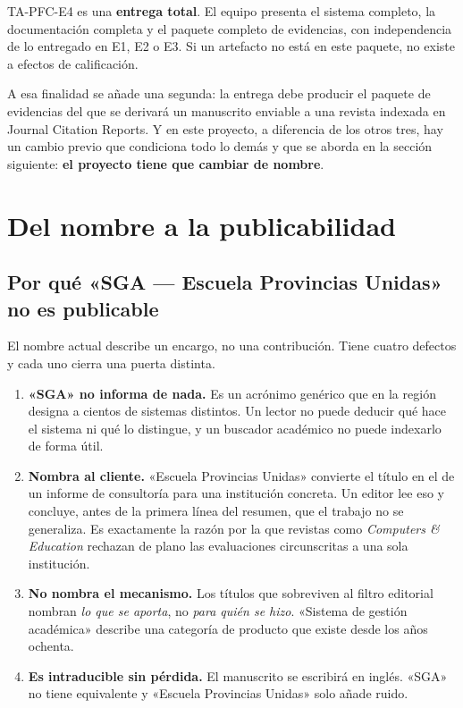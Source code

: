 \documentclass[11pt,a4paper]{article}
\begin{document}
TA-PFC-E4 es una \textbf{entrega total}. El equipo presenta el sistema completo, la documentación completa y el paquete completo de evidencias, con independencia de lo entregado en E1, E2 o E3. Si un artefacto no está en este paquete, no existe a efectos de calificación.

A esa finalidad se añade una segunda: la entrega debe producir el paquete de evidencias del que se derivará un manuscrito enviable a una revista indexada en Journal Citation Reports. Y en este proyecto, a diferencia de los otros tres, hay un cambio previo que condiciona todo lo demás y que se aborda en la sección siguiente: \textbf{el proyecto tiene que cambiar de nombre}.

\section{Del nombre a la publicabilidad}

\subsection{Por qué «SGA --- Escuela Provincias Unidas» no es publicable}

El nombre actual describe un encargo, no una contribución. Tiene cuatro defectos y cada uno cierra una puerta distinta.

\begin{enumerate}[leftmargin=*,itemsep=4pt]
	\item \textbf{«SGA» no informa de nada.} Es un acrónimo genérico que en la región designa a cientos de sistemas distintos. Un lector no puede deducir qué hace el sistema ni qué lo distingue, y un buscador académico no puede indexarlo de forma útil.
	\item \textbf{Nombra al cliente.} «Escuela Provincias Unidas» convierte el título en el de un informe de consultoría para una institución concreta. Un editor lee eso y concluye, antes de la primera línea del resumen, que el trabajo no se generaliza. Es exactamente la razón por la que revistas como \emph{Computers \& Education} rechazan de plano las evaluaciones circunscritas a una sola institución.
	\item \textbf{No nombra el mecanismo.} Los títulos que sobreviven al filtro editorial nombran \emph{lo que se aporta}, no \emph{para quién se hizo}. «Sistema de gestión académica» describe una categoría de producto que existe desde los años ochenta.
	\item \textbf{Es intraducible sin pérdida.} El manuscrito se escribirá en inglés. «SGA» no tiene equivalente y «Escuela Provincias Unidas» solo añade ruido.
\end{enumerate}
\end{document}

